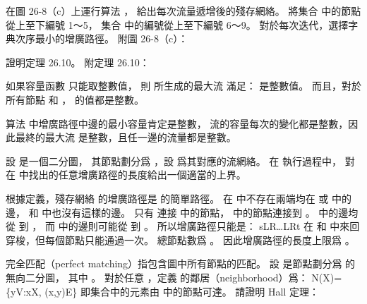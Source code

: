 \startsection[
  title={Maximum bipartite matching},
  reference={section:max_bipartite_match},
]

\startEXERCISE
在圖 26-8（c）上運行算法 ，
給出每次流量遞增後的殘存網絡。
將集合  中的節點從上至下編號 1～5，
集合  中的編號從上至下編號 6～9。
對於每次迭代，選擇字典次序最小的增廣路徑。
附圖 26-8（c）：

\externalfigure[output/e26_3_1-1]
\stopEXERCISE

\startANSWER
\startcombination[nx=4]
{\externalfigure[output/e26_3_1-2]}{}
{\externalfigure[output/e26_3_1-3]}{}
{\externalfigure[output/e26_3_1-4]}{}
{\externalfigure[output/e26_3_1-5]}{}
\stopcombination
\startcombination[nx=4]
{\externalfigure[output/e26_3_1-6]}{}
{\externalfigure[output/e26_3_1-7]}{}
{\externalfigure[output/e26_3_1-8]}{}
{}{}
\stopcombination
\stopANSWER

\startEXERCISE
證明定理 26.10。
附定理 26.10：

如果容量函數  只能取整數值，
則  所生成的最大流  滿足：  是整數值。
而且，對於所有節點  和 ，  的值都是整數。
\stopEXERCISE

\startANSWER
算法  中增廣路徑中邊的最小容量肯定是整數，
流的容量每次的變化都是整數，因此最終的最大流  是整數，且任一邊的流量都是整數。
\stopANSWER

\startEXERCISE
設  是一個二分圖，
其節點劃分爲 ，設  爲其對應的流網絡。
在  執行過程中，
對在  中找出的任意增廣路徑的長度給出一個適當的上界。
\stopEXERCISE

\startANSWER
根據定義，殘存網絡  的增廣路徑是  的簡單路徑。
在  中不存在兩端均在  或  中的邊，
  和  中也沒有這樣的邊。
只有  連接  中的節點，  中的節點連接到 。
  中的邊均從  到 ，
而  中的邊則可能從  到 。
所以增廣路徑只能是：
\startformula
s\rightarrow L\rightarrow R\rightarrow \ldots \rightarrow L\rightarrow R\rightarrow t
\stopformula
在  和  中來回穿梭，但每個節點只能通過一次。
總節點數爲 。
因此增廣路徑的長度上限爲 。
\stopANSWER

\startEXERCISE\DIFFICULT
{\EMP 完全匹配（perfect matching）}指包含圖中所有節點的匹配。
設  是節點劃分爲  的無向二分圖，
其中 。
對於任意 ，定義  的{\EMP 鄰居（neighborhood）}爲：
\startformula
N(X)=\{y\in V:\exists x\in X, (x,y)\in E\}
\stopformula
即集合中的元素由  中的節點可達。
請證明 Hall 定理：

